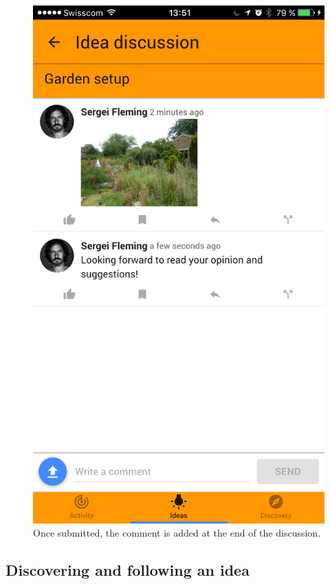 \documentclass[a4paper,12pt,twoside]{article}
\begin{document}
\begin{figure}[!htb]
\begin{minipage}[t]{.32\textwidth}
        \includegraphics[width=\textwidth]{images/flow_addComment_3.png}
        \caption{Once submitted, the comment is added at the end of the discussion.}
    \end{minipage}
\end{figure}

\clearpage
\subsection{Discovering and following an idea}
\end{document}
